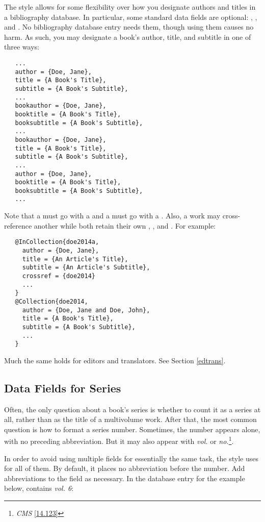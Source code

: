 \documentclass[11pt,letterpaper,oneside]{article}
\begin{document}
The style allows for some flexibility over how you designate authors
and titles in a bibliography database. In particular, some standard
data fields are optional: , ,
and . No bibliography database entry needs
them, though using them causes no harm. As such, you may designate a
book's author, title, and subtitle in one of three ways:

\begin{verbatim}
   ...
   author = {Doe, Jane},
   title = {A Book's Title},
   subtitle = {A Book's Subtitle},
   ...
   bookauthor = {Doe, Jane},
   booktitle = {A Book's Title},
   booksubtitle = {A Book's Subtitle},
   ...
   bookauthor = {Doe, Jane},
   title = {A Book's Title},
   subtitle = {A Book's Subtitle},
   ...
   author = {Doe, Jane},
   booktitle = {A Book's Title},
   booksubtitle = {A Book's Subtitle},
   ...
\end{verbatim}

\noindent Note that a  must go with a
 and a  must go with a
. Also, a work may cross-reference another while
both retain their own , , and
. For example:

\begin{verbatim}
   @InCollection{doe2014a,
     author = {Doe, Jane},
     title = {An Article's Title},
     subtitle = {An Article's Subtitle},
     crossref = {doe2014}
     ...
   }
   @Collection{doe2014,
     author = {Doe, Jane and Doe, John},
     title = {A Book's Title},
     subtitle = {A Book's Subtitle},
     ...
   }
\end{verbatim}

\noindent Much the same holds for editors and translators. See Section
\ref{edtrans}.

\subsection{Data Fields for Series}

Often, the only question about a book's series is whether to count it
as a series at all, rather than as the title of a multivolume work.
After that, the most common question is how to format a series number.
Sometimes, the number appears alone, with no preceding abbreviation.
But it may also appear with \textit{vol.} or
\textit{no.}\footnote{\textit{CMS} \ref{14.123}}.

In order to avoid using multiple fields for essentially the same task,
the style uses  for all of them. By default, it
places no abbreviation before the number. Add abbreviations to the
field as necessary. In the database entry for the example below,
 contains \textit{vol. 6}:
\end{document}

